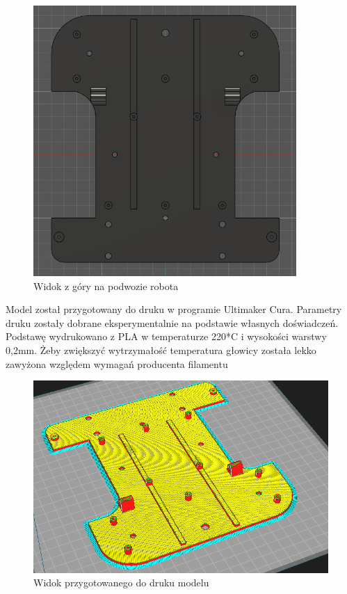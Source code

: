 \begin{figure}[H]
	\centering
	\includegraphics[width=10cm]{pages/robot/zdjecia/robotModelRama.png}
	\caption{Widok z góry na podwozie robota}
	\label{Fig:Rysunek}
\end{figure}
Model został przygotowany do druku w programie Ultimaker Cura. Parametry druku zostały dobrane 
eksperymentalnie na podstawie własnych doświadczeń. 
Podstawę wydrukowano z PLA w temperaturze 220*C i wysokości warstwy 0,2mm. 
Żeby zwiększyć wytrzymałość temperatura głowicy została lekko zawyżona względem wymagań producenta filamentu
\begin{figure}[H]
	\centering
	\includegraphics[width=13cm]{pages/robot/zdjecia/robotRamaCura.png}
	\caption{Widok przygotowanego do druku modelu}
	\label{fig:Rysunek}
\end{figure}
